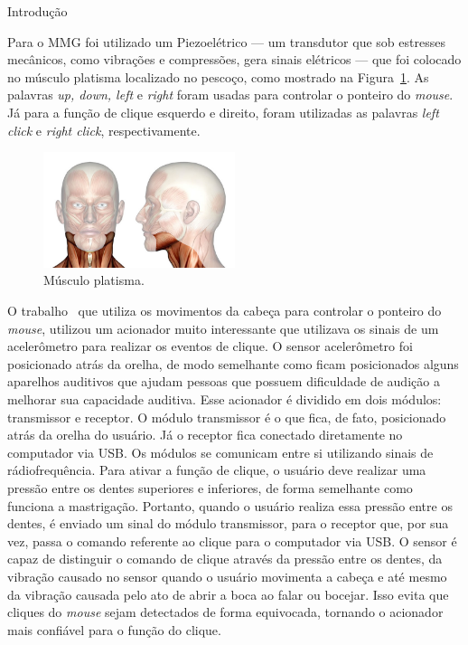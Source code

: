\begin{chapter}{Introdução}
\begin{figure}[h!]
\end{figure}
Para o MMG foi utilizado um Piezoelétrico --- um transdutor que sob estresses
mecânicos, como vibrações e compressões, gera sinais elétricos --- que foi
colocado no músculo platisma localizado no pescoço, como mostrado na
Figura~\ref{fig:platisma}. As palavras \textit{up, down, left} e \textit{right}
foram usadas para controlar o ponteiro do \textit{mouse}. Já para a função de
clique esquerdo e direito, foram utilizadas as palavras \textit{left click} e
\textit{right click}, respectivamente.
\begin{figure}[!h]
	\centering
	\includegraphics[width=0.5\textwidth]{fig/platisma}
	\caption{Músculo platisma.}
	\label{fig:platisma}
\end{figure}

O trabalho~\cite{Simpson08} que utiliza os movimentos da cabeça para controlar o
ponteiro do \textit{mouse}, utilizou um acionador muito interessante que
utilizava os sinais de um acelerômetro para realizar os eventos de clique. O
sensor acelerômetro foi posicionado atrás da orelha, de modo semelhante como
ficam posicionados alguns aparelhos auditivos que ajudam pessoas que possuem
dificuldade de audição a melhorar sua capacidade auditiva. Esse acionador é
dividido em dois módulos: transmissor e receptor. O módulo transmissor é o que
fica, de fato, posicionado atrás da orelha do usuário. Já o receptor fica
conectado diretamente no computador via USB. Os módulos se comunicam entre si
utilizando sinais de rádiofrequência. Para ativar a função de clique, o usuário
deve realizar uma pressão entre os dentes superiores e inferiores, de forma
semelhante como funciona a mastrigação. Portanto, quando o usuário realiza essa
pressão entre os dentes, é enviado um sinal do módulo transmissor, para o
receptor que, por sua vez, passa o comando referente ao clique para o computador
via USB. O sensor é capaz de distinguir o comando de clique através da pressão
entre os dentes, da vibração causado no sensor quando o usuário movimenta a
cabeça e até mesmo da vibração causada pelo ato de abrir a boca ao falar ou
bocejar. Isso evita que cliques do \textit{mouse} sejam detectados de forma
equivocada, tornando o acionador mais confiável para o função do clique. 


\end{chapter}
